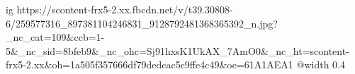 
 
 
 
 

\ifcmt
  ig https://scontent-frx5-2.xx.fbcdn.net/v/t39.30808-6/259577316_897381104246831_9128792481368365392_n.jpg?_nc_cat=109&ccb=1-5&_nc_sid=8bfeb9&_nc_ohc=Sj91hxsK1UkAX_7AmO0&_nc_ht=scontent-frx5-2.xx&oh=1a505f357666df79dedcac5c9ffe4c49&oe=61A1AEA1
  @width 0.4
\fi
